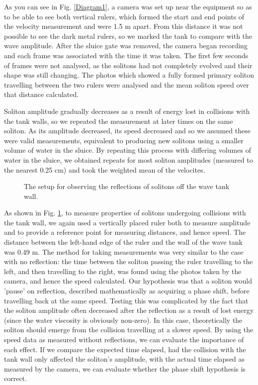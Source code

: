 \documentclass[10pt, twocolumn]{revtex4}    %
\begin{document}
As you can see in Fig. \ref{Diagram1}, a camera was set up near the equipment so as to be able to see both vertical rulers, which formed the start and end points of the velocity measurement and were 1.5 m apart. From this distance it was not possible to see the dark metal rulers, so we marked the tank to compare with the wave amplitude. After the sluice gate was removed, the camera began recording and each frame was associated with the time it was taken. The first few seconds of frames were not analysed, as the solitons had not completely evolved and their shape was still changing. The photos which showed a fully formed primary soliton travelling between the two rulers were analysed and the mean soliton speed over that distance calculated.

Soliton amplitude gradually decreases as a result of energy lost in collisions with the tank walls, so we repeated the measurement at later times on the same soliton. As its amplitude decreased, its speed decreased and so we assumed these were valid measurements, equivalent to producing new solitons using a smaller volume of water in the sluice. By repeating this process with differing volumes of water in the sluice, we obtained repeats for most soliton amplitudes (measured to the nearest 0.25 cm) and took the weighted mean of the velocites.

\begin{figure}[h]
\caption{The setup for observing the reflections of solitons off the wave tank wall.}
\label{Diagram2}
\end{figure}

As shown in Fig. \ref{Diagram2}, to measure properties of solitons undergoing collisions with the tank wall, we again used a vertically placed ruler both to measure amplitude and to provide a reference point for measuring distances, and hence speed. The distance between the left-hand edge of the ruler and the wall of the wave tank was 0.49 m. The method for taking measurements was very similar to the case with no reflection: the time between the soliton passing the ruler travelling to the left, and then travelling to the right, was found using the photos taken by the camera, and hence the speed calculated. Our hypothesis was that a soliton would 'pause' on reflection, described mathematically as acquiring a phase shift, before travelling back at the same speed. Testing this was complicated by the fact that the soliton amplitude often decreased after the reflection as a result of lost energy (since the water viscosity is obviously non-zero). In this case, theoretically the soliton should emerge from the collision travelling at a slower speed. By using the speed data as measured without reflections, we can evaluate the importance of each effect. If we compare the expected time elapsed, had the collision with the tank wall only affected the soliton's amplitude, with the actual time elapsed as measured by the camera, we can evaluate whether the phase shift hypothesis is correct. 
\end{document}
